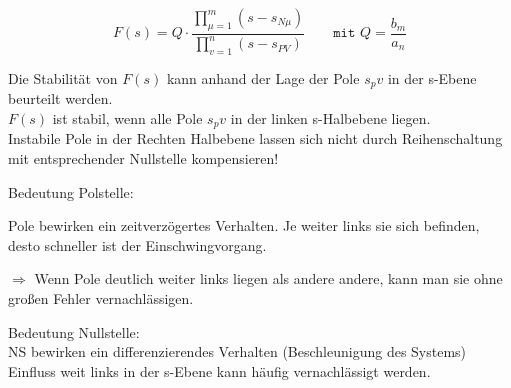\documentclass[10pt,a4paper]{article}
\begin{document}
\[
	F(s)=Q \cdot \frac{\prod_{\mu=1}^{m}\left(s-s_{N \mu}\right)}{\prod_{v=1}^{n}\left(s-s_{P V}\right)}
	\qquad \texttt{mit } Q = \frac{b_m}{a_n}
\]

\begin{mdframed}[style=exercise]
	Die Stabilität von $F(s)$ kann anhand der Lage der Pole $s_pv$ in der s-Ebene
	beurteilt werden.\\ $F(s)$ ist stabil, wenn alle Pole $s_pv$ in der linken
	s-Halbebene liegen.\\ Instabile Pole in der Rechten Halbebene lassen sich
	nicht durch Reihenschaltung mit entsprechender Nullstelle kompensieren!
\end{mdframed}
\begin{mdframed}[style=exercise]
	Bedeutung Polstelle:

	Pole bewirken ein zeitverzögertes Verhalten. Je weiter links sie sich befinden,
	desto schneller ist der Einschwingvorgang.

	$\Rightarrow$ Wenn Pole deutlich weiter links liegen als andere andere, kann man sie ohne
	großen Fehler vernachlässigen.
\end{mdframed}
\begin{mdframed}[style=exercise]
	Bedeutung Nullstelle:\\
	NS bewirken ein differenzierendes Verhalten (Beschleunigung des Systems)
	Einfluss weit links in der s-Ebene kann häufig vernachlässigt werden.

\end{mdframed}
\end{document}

